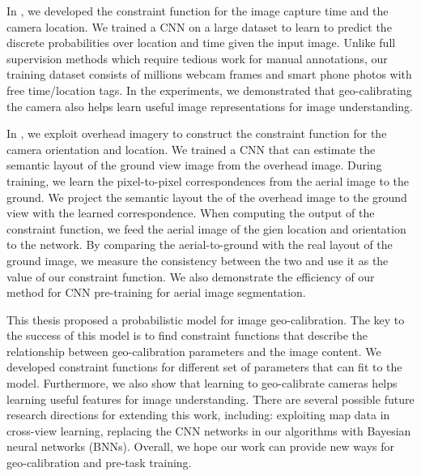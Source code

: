 In , we developed the constraint function for 
the image capture time and the camera location. 
We trained a CNN on a large dataset to learn to predict the discrete
probabilities over location and time given the input image.
Unlike full supervision methods which require tedious work for manual
annotations, our training dataset consists of millions webcam
frames and smart phone photos with free time/location tags.
In the experiments, we demonstrated that geo-calibrating the camera
also helps learn useful image representations for image understanding.

In , we exploit overhead imagery to construct
the constraint function for the camera orientation and location.
We trained a CNN that can estimate the semantic layout of the ground
view image from the overhead image. During training, we learn the
pixel-to-pixel correspondences from the aerial image to the ground. We
project the semantic layout the of the overhead image to the ground
view with the learned correspondence.
When computing the output of the constraint function, we feed the
aerial image of the gien location and orientation to the network. By
comparing the aerial-to-ground with the real layout of the ground
image, we measure the consistency between the two and use
it as the value of our constraint function.
We also demonstrate the efficiency of our method for CNN pre-training
for aerial image segmentation.

This thesis proposed a probabilistic model for image
geo-calibration.
The key to the success of this model is to find constraint
functions that describe the relationship between geo-calibration
parameters and the image content. We developed constraint
functions for different set of parameters that can fit to the model.
Furthermore, we also show that learning to geo-calibrate cameras helps learning
useful features for image understanding.
There are several possible future research directions for extending
this work, including: exploiting map data in cross-view learning,
replacing the CNN networks in our algorithms with Bayesian neural
networks (BNNs).
Overall, we hope our work can provide new ways for geo-calibration and
pre-task training.
